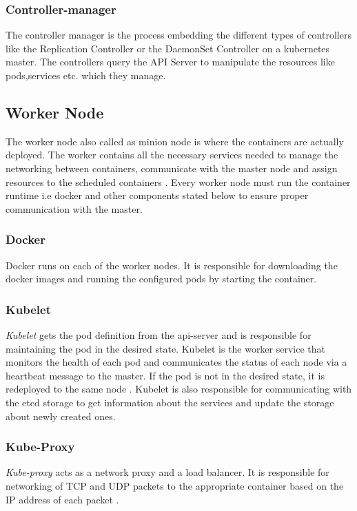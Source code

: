 \documentclass[9pt,twocolumn,twoside]{../../styles/osajnl}
\begin{document}
\subsubsection{Controller-manager}
The controller manager is the process embedding the different types of
controllers like the Replication Controller or the DaemonSet
Controller on a kubernetes master. The controllers query the API
Server to manipulate the resources like pods,services etc. which they
manage.

\subsection{Worker Node}
The worker node also called as minion node is where the containers are
actually deployed. The worker contains all the necessary services
needed to manage the networking between containers, communicate with
the master node and assign resources to the scheduled containers
\cite{www-kubernetes-architecture}.  Every worker node must run the container runtime i.e docker
and other components stated below to ensure proper communication with
the master.

\subsubsection{Docker}
Docker runs on each of the worker nodes. It is responsible for
downloading the docker images and running the configured pods by
starting the container.

\subsubsection{Kubelet}
\emph{Kubelet} gets the pod definition from the api-server and is
responsible for maintaining the pod in the desired state. Kubelet is
the worker service that monitors the health of each pod and
communicates the status of each node via a heartbeat message to the
master.  If the pod is not in the desired state, it is redeployed to
the same node \cite{www-wiki-kubernetes}. Kubelet is also responsible for communicating
with the etcd storage to get information about the services and update
the storage about newly created ones.

\subsubsection{Kube-Proxy}
\emph{Kube-proxy} acts as a network proxy and a load balancer. It is
responsible for networking of TCP and UDP packets to the appropriate
container based on the IP address of each packet \cite{www-wiki-kubernetes} \cite{www-kubernetes-architecture}.
\end{document}
